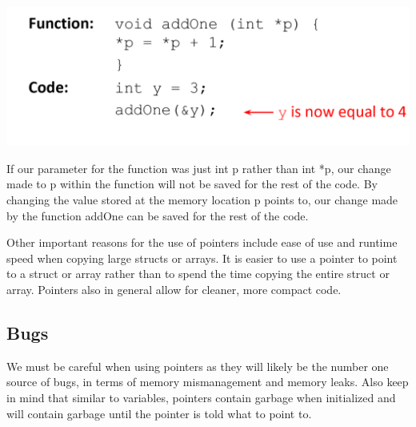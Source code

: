\documentclass[letterpaper]{article}
\theoremstyle{remark}
\begin{document}
\includegraphics[scale=.5]{byvalue}

If our parameter for the function was just int p rather than int *p, our change made to p within the function will not be saved for the rest of the code. By changing the value stored at the memory location p points to, our change made by the function addOne can be saved for the rest of the code.

Other important reasons for the use of pointers include ease of use and runtime speed when copying large structs or arrays. It is easier to use a pointer to point to a struct or array rather than to spend the time copying the entire struct or array. Pointers also in general allow for cleaner, more compact code.

\subsection{Bugs}
We must be careful when using pointers as they will likely be the number one source of bugs, in terms of memory mismanagement and memory leaks. Also keep in mind that similar to variables, pointers contain garbage when initialized and will contain garbage until the pointer is told what to point to.
\end{document}
